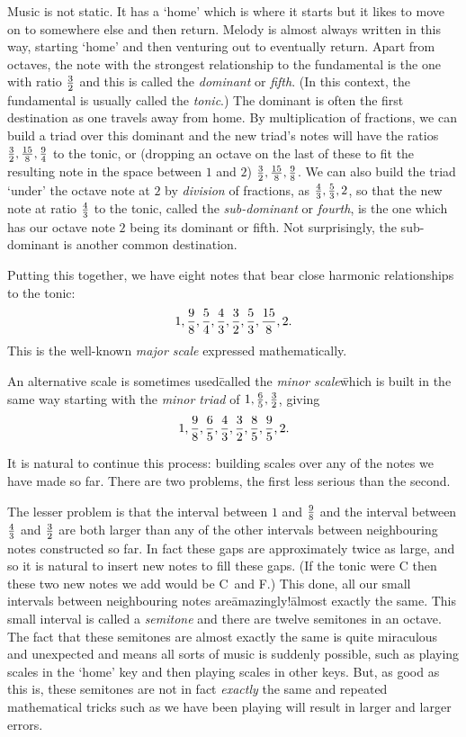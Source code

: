 Music is not static.  It has a `home' which is where it starts but it
likes to move on to somewhere else and then return. Melody is
almost always written in this way, starting `home' and then venturing
out to eventually return.  Apart from octaves, the note with the strongest relationship to
the fundamental is the one with ratio $3\over 2$ and this is called
the \textit{dominant} or \textit{fifth}.  (In this context, the
fundamental is usually called the \textit{tonic}.)  The dominant
is often the first destination as one travels away from home. By multiplication
of fractions, we can build a triad over this dominant and the new
triad's notes will have the ratios ${3\over 2}, {15\over 8}, {9\over 4}$
to the tonic, or (dropping an octave on the last of these to fit
the resulting note in the space between $1$ and $2$) ${3\over 2},
{15\over 8}, {9\over 8}$.  We can also build the triad `under' the
octave note at $2$ by \textit{division} of fractions, as
${4 \over 3}, {5\over 3}, 2$,
so that the new note at ratio $4\over 3$ to the tonic, called
the \textit{sub-dominant} or \textit{fourth}, is the one which has our
octave note $2$ being its dominant or fifth.  Not surprisingly, the
sub-dominant is another common destination.

Putting this together, we have eight notes that bear close harmonic
relationships to the tonic:
\[
1, {9\over 8}, {5\over 4}, {4\over 3}, {3\over 2}, {5\over 3}, {15\over 8}, 2.
\]
This is the well-known \textit{major scale} expressed mathematically.

An alternative scale is sometimes used\=called the \textit{minor scale}\=which
is built in the same way starting with the \textit{minor triad} of
$1, {6\over 5}, {3\over 2}$, giving
\[
1, {9\over 8}, {6\over 5}, {4\over 3}, {3\over 2}, {8\over 5}, {9\over 5}, 2.
\]

It is natural to continue this process: building scales over any of
the notes we have made so far.  There are two problems, the first less
serious than the second.

The lesser problem is that the interval between $1$ and ${9\over 8}$
and the interval between ${4\over 3}$ and ${3\over 2}$ are both larger than
any of the other intervals between neighbouring notes
constructed so far.  In fact these gaps are approximately twice as large, and
so it is natural to insert new notes to fill these gaps.  (If the
tonic were C then these two new notes we add would be C\sh\ and F\sh.)  This
done, all our small intervals between neighbouring notes
are\=amazingly!\=almost exactly the same.  This small interval is
called a \textit{semitone} and there are twelve semitones in an
octave.  The fact that these semitones are almost exactly the same is
quite miraculous and unexpected and means all sorts of music is
suddenly possible, such as playing scales in the `home' key and then
playing scales in other keys.  But, as good as this is, these semitones
are not in fact \textit{exactly} the same and repeated mathematical
tricks such as we have been playing will result in larger and larger errors.


